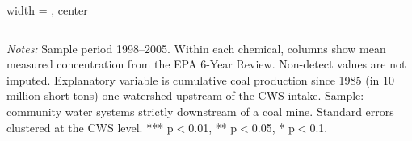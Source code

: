 \begin{table}[htbp]
\begin{adjustbox}{width = \textwidth, center}
\begin{tabular}{lccccc}
         \bottomrule
         
      \end{tabular}
      
      
      
   \end{adjustbox}
      {\tiny\linespread{1}\selectfont \par \raggedright 
   \textit{Notes:} Sample period 1998--2005. Within each chemical, columns show mean measured concentration from the EPA 6-Year Review. Non-detect values are not imputed. Explanatory variable is cumulative coal production since 1985 (in 10 million short tons) one watershed upstream of the CWS intake. Sample: community water systems strictly downstream of a coal mine. Standard errors clustered at the CWS level. *** p$<$0.01, ** p$<$0.05, * p$<$0.1.}
   
\end{table}


